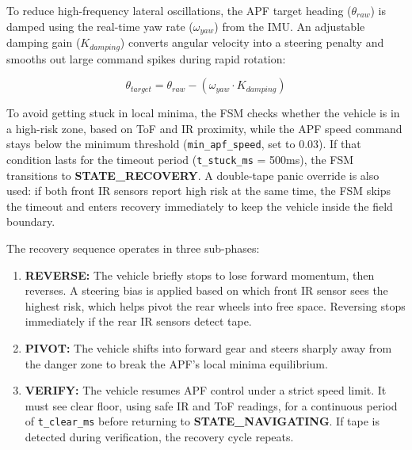 To reduce high-frequency lateral oscillations, the APF target heading ($\theta_{raw}$) is damped using the real-time yaw rate ($\omega_{yaw}$) from the IMU. An adjustable damping gain ($K_{damping}$) converts angular velocity into a steering penalty and smooths out large command spikes during rapid rotation:

$$ \theta_{target} = \theta_{raw} - (\omega_{yaw} \cdot K_{damping}) $$

To avoid getting stuck in local minima, the FSM checks whether the vehicle is in a high-risk zone, based on ToF and IR proximity, while the APF speed command stays below the minimum threshold (\texttt{min\_apf\_speed}, set to 0.03). If that condition lasts for the timeout period (\texttt{t\_stuck\_ms} = 500ms), the FSM transitions to \textbf{STATE\_RECOVERY}. A double-tape panic override is also used: if both front IR sensors report high risk at the same time, the FSM skips the timeout and enters recovery immediately to keep the vehicle inside the field boundary.

The recovery sequence operates in three sub-phases:
\begin{enumerate}
    \item \textbf{REVERSE:} The vehicle briefly stops to lose forward momentum, then reverses. A steering bias is applied based on which front IR sensor sees the highest risk, which helps pivot the rear wheels into free space. Reversing stops immediately if the rear IR sensors detect tape.
    \item \textbf{PIVOT:} The vehicle shifts into forward gear and steers sharply away from the danger zone to break the APF's local minima equilibrium.
    \item \textbf{VERIFY:} The vehicle resumes APF control under a strict speed limit. It must see clear floor, using safe IR and ToF readings, for a continuous period of \texttt{t\_clear\_ms} before returning to \textbf{STATE\_NAVIGATING}. If tape is detected during verification, the recovery cycle repeats.
\end{enumerate}